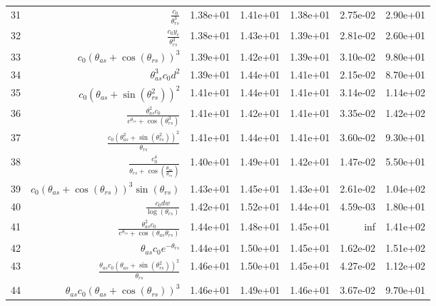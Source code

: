 \begin{tabularx}{\textwidth}{lRRRRRl}
31  &  $ \displaystyle\frac{c_{0}}{\theta_{rs}^{3}} $  &  1.38e+01  &  1.41e+01  &  1.38e+01  &  2.75e-02  &  2.90e+01  \\ 
32  &  $ \displaystyle\frac{c_{0} y_c}{\theta_{rs}^{3}} $  &  1.38e+01  &  1.43e+01  &  1.39e+01  &  2.81e-02  &  2.60e+01  \\ 
33  &  $ c_{0} \left(\theta_{as} + \cos{\left(\theta_{rs} \right)}\right)^{3} $  &  1.39e+01  &  1.42e+01  &  1.39e+01  &  3.10e-02  &  9.80e+01  \\ 
34  &  $ \theta_{as}^{3} c_{0} d^{2} $  &  1.39e+01  &  1.44e+01  &  1.41e+01  &  2.15e-02  &  8.70e+01  \\ 
35  &  $ c_{0} \left(\theta_{as} + \sin{\left(\theta_{rs}^{2} \right)}\right)^{2} $  &  1.41e+01  &  1.44e+01  &  1.41e+01  &  3.14e-02  &  1.14e+02  \\ 
36  &  $ \displaystyle\frac{\theta_{as}^{2} c_{0}}{e^{\theta_{rs}} + \cos{\left(\theta_{rs}^{3} \right)}} $  &  1.41e+01  &  1.42e+01  &  1.41e+01  &  3.35e-02  &  1.42e+02  \\ 
37  &  $ \displaystyle\frac{c_{0} \left(\theta_{as}^{2} + \sin{\left(\theta_{rs}^{2} \right)}\right)^{2}}{\theta_{rs}} $  &  1.41e+01  &  1.44e+01  &  1.41e+01  &  3.60e-02  &  9.30e+01  \\ 
38  &  $ \displaystyle\frac{c_{0}^{4}}{\theta_{rs} + \cos{\left(\displaystyle\frac{\theta_{as}}{\theta_{rs}} \right)}} $  &  1.40e+01  &  1.49e+01  &  1.42e+01  &  1.47e-02  &  5.50e+01  \\ 
39  &  $ c_{0} \left(\theta_{as} + \cos{\left(\theta_{rs} \right)}\right)^{3} \sin{\left(\theta_{rs} \right)} $  &  1.43e+01  &  1.45e+01  &  1.43e+01  &  2.61e-02  &  1.04e+02  \\ 
40  &  $ \displaystyle\frac{c_{0} d w}{\log{\left(\theta_{rs} \right)}} $  &  1.42e+01  &  1.52e+01  &  1.44e+01  &  4.59e-03  &  1.80e+01  \\ 
41  &  $ \displaystyle\frac{\theta_{as}^{2} c_{0}}{e^{\theta_{rs}} + \cos{\left(\theta_{as} \theta_{rs} \right)}} $  &  1.44e+01  &  1.48e+01  &  1.45e+01  &  inf  &  1.41e+02  \\ 
42  &  $ \theta_{as} c_{0} e^{- \theta_{rs}} $  &  1.44e+01  &  1.50e+01  &  1.45e+01  &  1.62e-02  &  1.51e+02  \\ 
43  &  $ \displaystyle\frac{\theta_{as} c_{0} \left(\theta_{as} + \sin{\left(\theta_{rs}^{2} \right)}\right)^{2}}{\theta_{rs}} $  &  1.46e+01  &  1.50e+01  &  1.45e+01  &  4.27e-02  &  1.12e+02  \\ 
44  &  $ \theta_{as} c_{0} \left(\theta_{as} + \cos{\left(\theta_{rs} \right)}\right)^{3} $  &  1.46e+01  &  1.49e+01  &  1.46e+01  &  3.67e-02  &  9.70e+01  \\ 

\end{tabularx}
